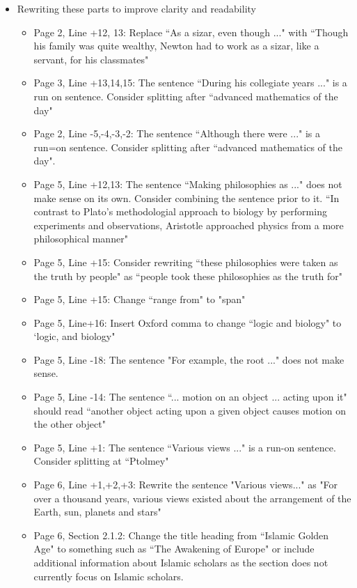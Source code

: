 \documentclass[11pt]{article}
\begin{document}
\begin{itemize}
\item Rewriting these parts to improve clarity and readability
	\begin{itemize}
		\item Page 2, Line +12, 13: Replace ``As a sizar, even though ..." with ``Though his family was quite wealthy, Newton had to work as a sizar, like a servant, for his classmates"
		\item Page 3, Line +13,14,15: The sentence ``During his collegiate years ..." is a run on sentence. Consider splitting after ``advanced mathematics of the day"
		\item Page 2, Line -5,-4,-3,-2: The sentence ``Although there were ..." is a run=on sentence. Consider splitting after ``advanced mathematics of the day".
		\item Page 5, Line +12,13: The sentence ``Making philosophies as ..."  does not make sense on its own. Consider combining the sentence prior to it. ``In contrast to Plato's methodologial approach to biology by performing experiments and observations, Aristotle approached physics from a more philosophical manner"
		\item Page 5, Line +15: Consider rewriting ``these philosophies were taken as the truth by people" as ``people took these philosophies as the truth for"
		\item Page 5, Line +15: Change ``range from" to "span"
		\item Page 5, Line+16: Insert Oxford comma to change ``logic and biology" to `logic, and biology"
		\item Page 5, Line -18: The sentence "For example, the root ..." does not make sense.
		\item Page 5, Line -14: The sentence ``... motion on an object ... acting upon it" should read ``another object acting upon a given object causes motion on the other object"
		\item Page 5, Line +1: The sentence ``Various views ..." is a run-on sentence. Consider splitting at ``Ptolmey"
		\item Page 6, Line +1,+2,+3: Rewrite the sentence "Various views..." as "For over a thousand years, various views existed about the arrangement of the Earth, sun, planets and stars"
		\item Page 6, Section 2.1.2: Change the title heading from ``Islamic Golden Age" to something such as ``The Awakening of Europe" or include additional information about Islamic scholars as the section does not currently focus on Islamic scholars.

\end{itemize}
\end{itemize}
\end{document}
